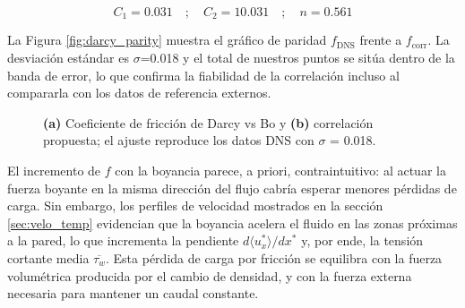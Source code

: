 \begin{small}
$$
C_1 = 0\text{.}031 \quad ; \quad C_2 = 10\text{.}031 \quad ; \quad n = 0\text{.}561
$$
\end{small}

La Figura \ref{fig:darcy_parity} muestra el gráfico de paridad $f_{\text{DNS}}$ frente a $f_{\text{corr}}$. La desviación estándar es $\sigma$=0.018 y el total de nuestros puntos se sitúa dentro de la banda de error, lo que confirma la fiabilidad de la correlación incluso al compararla con los datos de referencia externos.

\newpage

\begin{figure}[H]
  \centering
  \caption{\textbf{(a)} Coeficiente de fricción de Darcy vs Bo y \textbf{(b)} correlación propuesta; el ajuste reproduce los datos DNS con $\sigma$ = 0.018.}
  \label{fig:nusselt}
\end{figure}

El incremento de $f$ con la boyancia parece, a priori, contraintuitivo: al actuar la fuerza boyante en la misma dirección del flujo cabría esperar menores pérdidas de carga. Sin embargo, los perfiles de velocidad mostrados en la sección \ref{sec:velo_temp} evidencian que la boyancia acelera el fluido en las zonas próximas a la pared, lo que incrementa la pendiente $d \langle u^*_x \rangle / dx^*$ y, por ende, la tensión cortante media $\overline{\tau_w}$. Esta pérdida de carga por fricción se equilibra con la fuerza volumétrica producida por el cambio de densidad, y con la fuerza externa necesaria para mantener un caudal constante.


